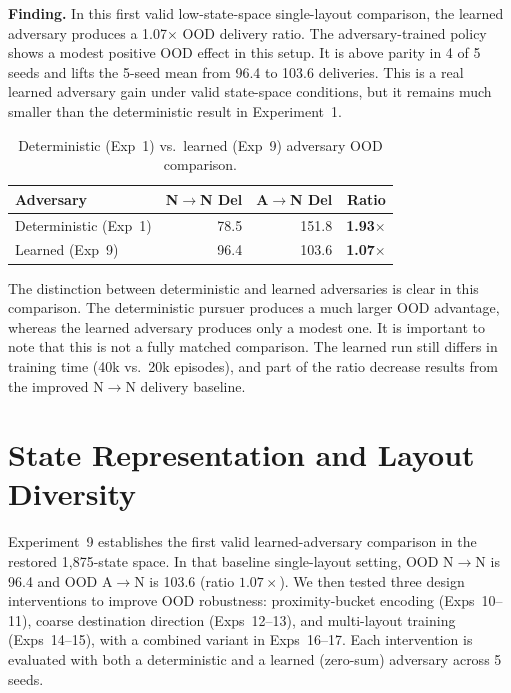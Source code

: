 \documentclass[sigconf]{aamas}
\begin{document}
\textbf{Finding.} In this first valid low-state-space single-layout comparison, the learned adversary produces a
1.07$\times$ OOD delivery ratio. The adversary-trained policy shows a modest
positive OOD effect in this setup. It is above parity in 4 of 5 seeds and lifts
the 5-seed mean from 96.4 to 103.6 deliveries. This is a real learned adversary
gain under valid state-space conditions, but it remains much smaller than the
deterministic result in Experiment~1.

\begin{table}[H]
\caption{Deterministic (Exp~1) vs.\ learned (Exp~9) adversary OOD comparison.}
\label{tab:det-vs-learned}
\centering
\footnotesize
\begin{tabular}{lrrr}
\toprule
\textbf{Adversary} & \textbf{N$\to$N Del} & \textbf{A$\to$N Del} & \textbf{Ratio} \\
\midrule
Deterministic (Exp~1) & 78.5 & 151.8 & \textbf{1.93$\times$} \\
Learned (Exp~9)    & 96.4 & 103.6 & \textbf{1.07$\times$} \\
\bottomrule
\end{tabular}
\end{table}

The distinction between deterministic and learned adversaries is clear in this
comparison. The deterministic pursuer produces a much larger OOD advantage, whereas the
learned adversary produces only a modest one. It is important to note that this is not a
fully matched comparison. The learned run still differs in training time (40k vs.\
20k episodes), and part of the ratio decrease results from the improved N$\to$N delivery baseline.

\section{State Representation and Layout Diversity}
\label{sec:stateexp}

Experiment~9 establishes the first valid learned-adversary comparison in the restored 1,875-state
space. In that baseline single-layout setting, OOD N$\to$N is 96.4 and OOD A$\to$N is 103.6
(ratio $1.07\times$). We then tested three design
interventions to improve OOD robustness: proximity-bucket encoding (Exps~10--11),
coarse destination direction (Exps~12--13), and multi-layout training (Exps~14--15),
with a combined variant in Exps~16--17. Each intervention is evaluated with both a
deterministic and a learned (zero-sum) adversary across 5 seeds.
\end{document}

